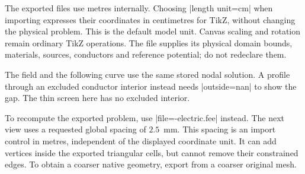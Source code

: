 The exported files use metres internally. Choosing |length unit=cm| when
importing expresses their coordinates in centimetres for TikZ, without changing
the physical problem. This is the default model unit. Canvas scaling and rotation
remain ordinary TikZ operations. The file supplies its physical domain bounds,
materials, sources, conductors and reference potential; do not redeclare them.

\Needspace{10cm}
\begin{codeexample}[width=0pt]
\end{codeexample}

The field and the following curve use the same stored nodal solution. A profile
through an excluded conductor interior instead needs |outside=nan| to show the
gap. The thin screen here has no excluded interior.

\Needspace{10cm}
\begin{codeexample}[width=0pt]
\begin{tikzpicture}
 \begin{axis}[width=7cm,height=4.5cm,
   xlabel={$x$ (cm)},ylabel={$V$ (V)},grid=major,
   xmin=0,xmax=2,ymin=0,ymax=10]
  \femmelectricplot[profile=restored potential,
    component=V,abscissa=x,plot options={blue,thick,mark=none}]
 \end{axis}
\end{tikzpicture}
\end{codeexample}

To recompute the exported problem, use |file=\jobname-electric.fee| instead.
The next view uses a requested global spacing of $2.5$~mm. This spacing is an
import control in metres, independent of the displayed coordinate unit.
It can add vertices inside the exported triangular cells, but cannot remove their
constrained edges. To obtain a coarser native geometry, export from a coarser
original mesh.

\begin{codeexample}[width=0pt]
\end{codeexample}

